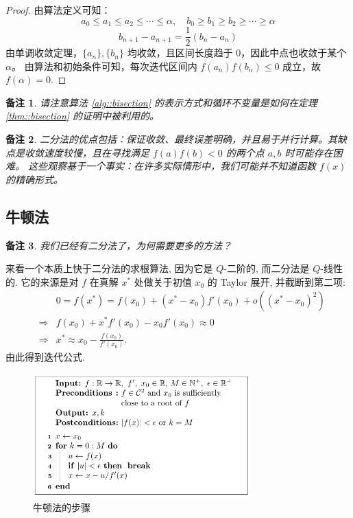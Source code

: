 \documentclass[a4paper]{ctexart}
\newtheorem{remark}{备注}
\numberwithin{theorem}{section}
\numberwithin{equation}{section}
\numberwithin{figure}{section}
\numberwithin{remark}{section}
\begin{document}
\begin{proof}
由算法定义可知：
\[
a_0 \le a_1 \le a_2 \le \cdots \le \alpha,\quad
b_0 \ge b_1 \ge b_2 \ge \cdots \ge \alpha
\]
\[
b_{n+1} - a_{n+1} = \frac{1}{2}(b_n - a_n)
\]
由单调收敛定理，\(\{a_n\}, \{b_n\}\) 均收敛，且区间长度趋于 $0$，因此中点也收敛于某个 \(\alpha\)。
由算法和初始条件可知，每次迭代区间内 \(f(a_n)f(b_n) \le 0\) 成立，故 \(f(\alpha) = 0\).
\end{proof}

\begin{remark}
请注意算法 \ref{alg::bisection} 的表示方式和循环\textit{不变量}是如何在定理 \ref{thm::bisection} 的证明中被利用的。
\end{remark}

\begin{remark}
二分法的优点包括：保证收敛、最终误差明确，并且易于并行计算。其缺点是收敛速度较慢，且在寻找满足 \( f(a)f(b) < 0 \) 的两个点 \(a, b\) 时可能存在困难。
这些观察基于一个事实：在许多实际情形中，我们可能并不知道函数 \(f(x)\) 的精确形式。
\end{remark}

\subsection{牛顿法}
\begin{remark}
    我们已经有二分法了，为何需要更多的方法？
\end{remark}

来看一个本质上快于二分法的求根算法, 因为它是 $Q$-二阶的, 而二分法是
$Q$-线性的. 它的来源是对 $f$ 在真解 $x^*$ 处做关于初值 $x_0$ 的 Taylor
展开, 并截断到第二项:
\begin{eqnarray*}
  &&0 = f(x^*)=f(x_0)+(x^* - x_0)f'(x_0) + o((x^* - x_0)^2) \\
  &\Rightarrow&f(x_0) + x^*f'(x_0) - x_0f'(x_0) \approx 0 \\
  &\Rightarrow&x^* \approx x_0 - \frac{f(x_0)}{f'(x_0)}.
\end{eqnarray*}
由此得到迭代公式.

\begin{figure}
\centering
\includegraphics[width=0.75\textwidth]{images/newton_method.png}
\caption{牛顿法的步骤}    
\label{fig::newton}
\end{figure}
\end{document}
